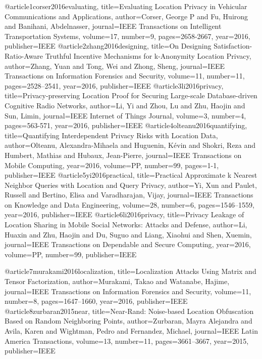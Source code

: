 {{{{@article{1corser2016evaluating,
	title={Evaluating Location Privacy in Vehicular Communications and Applications},
	author={Corser, George P and Fu, Huirong and Banihani, Abdelnasser},
	journal={IEEE Transactions on Intelligent Transportation Systems},
	volume={17},
	number={9},
	pages={2658-2667},
	year={2016},
	publisher={IEEE}
}
@article{2zhang2016designing,
	title={On Designing Satisfaction-Ratio-Aware Truthful Incentive Mechanisms for k-Anonymity Location Privacy},
	author={Zhang, Yuan and Tong, Wei and Zhong, Sheng},
	journal={IEEE Transactions on Information Forensics and Security},
	volume={11},
	number={11},
	pages={2528--2541},
	year={2016},
	publisher={IEEE}
}
@article{3li2016privacy,
	title={Privacy-preserving Location Proof for Securing Large-scale Database-driven Cognitive Radio Networks},
	author={Li, Yi and Zhou, Lu and Zhu, Haojin and Sun, Limin},
	journal={IEEE Internet of Things Journal},
	volume={3},
	number={4},
	pages={563-571},
	year={2016},
	publisher={IEEE}
}
@article{4olteanu2016quantifying,
	title={Quantifying Interdependent Privacy Risks with Location Data},
	author={Olteanu, Alexandra-Mihaela and Huguenin, K{\'e}vin and Shokri, Reza and Humbert, Mathias and Hubaux, Jean-Pierre},
	journal={IEEE Transactions on Mobile Computing},
	year={2016},
	volume={PP},
	number={99},
	pages={1-1},
	publisher={IEEE}
}
@article{5yi2016practical,
	title={Practical Approximate k Nearest Neighbor Queries with Location and Query Privacy},
	author={Yi, Xun and Paulet, Russell and Bertino, Elisa and Varadharajan, Vijay},
	journal={IEEE Transactions on Knowledge and Data Engineering},
	volume={28},
	number={6},
	pages={1546--1559},
	year={2016},
	publisher={IEEE}
}
@article{6li2016privacy,
	title={Privacy Leakage of Location Sharing in Mobile Social Networks: Attacks and Defense},
	author={Li, Huaxin and Zhu, Haojin and Du, Suguo and Liang, Xiaohui and Shen, Xuemin},
	journal={IEEE Transactions on Dependable and Secure Computing},
	year={2016},
	volume={PP},
	number={99},
	publisher={IEEE}
}

@article{7murakami2016localization,
	title={Localization Attacks Using Matrix and Tensor Factorization},
	author={Murakami, Takao and Watanabe, Hajime},
	journal={IEEE Transactions on Information Forensics and Security},
	volume={11},
	number={8},
	pages={1647--1660},
	year={2016},
	publisher={IEEE}
}
@article{8zurbaran2015near,
	title={Near-Rand: Noise-based Location Obfuscation Based on Random Neighboring Points},
	author={Zurbaran, Mayra Alejandra and Avila, Karen and Wightman, Pedro and Fernandez, Michael},
	journal={IEEE Latin America Transactions},
	volume={13},
	number={11},
	pages={3661--3667},
	year={2015},
	publisher={IEEE}
}

}}}}
